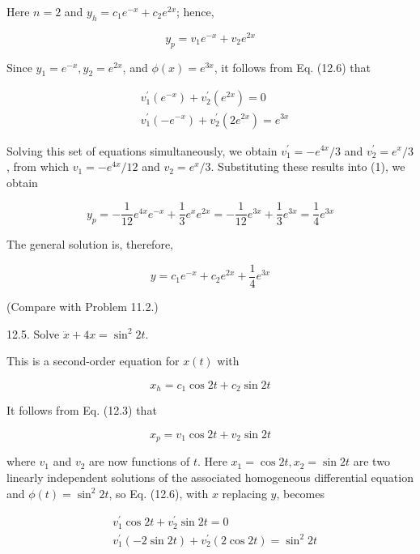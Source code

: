 \documentclass[10pt]{article}
\begin{document}
Here $n=2$ and $y_{h}=c_{1} e^{-x}+c_{2} e^{2 x}$; hence,


\begin{equation*}
y_{p}=v_{1} e^{-x}+v_{2} e^{2 x} \tag{1}
\end{equation*}


Since $y_{1}=e^{-x}, y_{2}=e^{2 x}$, and $\phi(x)=e^{3 x}$, it follows from Eq. (12.6) that

$$
\begin{aligned}
& v_{1}^{\prime}\left(e^{-x}\right)+v_{2}^{\prime}\left(e^{2 x}\right)=0 \\
& v_{1}^{\prime}\left(-e^{-x}\right)+v_{2}^{\prime}\left(2 e^{2 x}\right)=e^{3 x}
\end{aligned}
$$

Solving this set of equations simultaneously, we obtain $v_{1}^{\prime}=-e^{4 x} / 3$ and $v_{2}^{\prime}=e^{x} / 3$, from which $v_{1}=-e^{4 x} / 12$ and $v_{2}=e^{x} / 3$. Substituting these results into (1), we obtain

$$
y_{p}=-\frac{1}{12} e^{4 x} e^{-x}+\frac{1}{3} e^{x} e^{2 x}=-\frac{1}{12} e^{3 x}+\frac{1}{3} e^{3 x}=\frac{1}{4} e^{3 x}
$$

The general solution is, therefore,

$$
y=c_{1} e^{-x}+c_{2} e^{2 x}+\frac{1}{4} e^{3 x}
$$

(Compare with Problem 11.2.)

12.5. Solve $\ddot{x}+4 x=\sin ^{2} 2 t$.

This is a second-order equation for $x(t)$ with

$$
x_{h}=c_{1} \cos 2 t+c_{2} \sin 2 t
$$

It follows from Eq. (12.3) that


\begin{equation*}
x_{p}=v_{1} \cos 2 t+v_{2} \sin 2 t \tag{1}
\end{equation*}


where $v_{1}$ and $v_{2}$ are now functions of $t$. Here $x_{1}=\cos 2 t, x_{2}=\sin 2 t$ are two linearly independent solutions of the associated homogeneous differential equation and $\phi(t)=\sin ^{2} 2 t$, so Eq. (12.6), with $x$ replacing $y$, becomes

$$
\begin{aligned}
& v_{1}^{\prime} \cos 2 t+v_{2}^{\prime} \sin 2 t=0 \\
& v_{1}^{\prime}(-2 \sin 2 t)+v_{2}^{\prime}(2 \cos 2 t)=\sin ^{2} 2 t
\end{aligned}
$$
\end{document}
